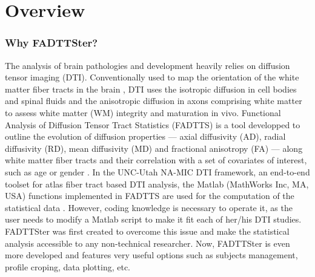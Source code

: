 \documentclass[fadttsterUserGuide_master]{subfiles}
\begin{document}
	\part{Overview}
		
	\section{Why FADTTSter?}	
	The analysis of brain pathologies and development heavily relies on diffusion tensor imaging (DTI). Conventionally used to map the orientation of the white matter fiber tracts in the brain \citep{dti_brain_mapping1_article,dti_brain_mapping2_article}, DTI uses the isotropic diffusion in cell bodies and spinal fluids and the anisotropic diffusion in axons comprising white matter \citep{dti_article} to assess white matter (WM) integrity and maturation in vivo.
	Functional Analysis of Diffusion Tensor Tract Statistics (FADTTS) is a tool developped to outline the evolution of diffusion properties --- axial diffusivity (AD), radial diffusivity (RD), mean diffusivity (MD) and fractional anisotropy (FA) --- along white matter fiber tracts and their correlation with a set of covariates of interest, such as age or gender \citep{fadtts_article}.
	In the UNC-Utah NA-MIC DTI framework, an end-to-end toolset for atlas fiber tract based DTI analysis, the Matlab (MathWorks Inc, MA, USA) functions implemented in FADTTS \citep{fadtts_manual} are used for the computation of the statistical data \citep{unc-utah_namic_article}.
	However, coding knowledge is necessary to operate it, as the user needs to modify a Matlab script to make it fit each of her/his DTI studies.
	FADTTSter was first created to overcome this issue and make the statistical analysis accessible to any non-technical researcher. Now, FADTTSter is even more developed and features very useful options such as subjects management, profile croping, data plotting, etc.	
		
\end{document}
